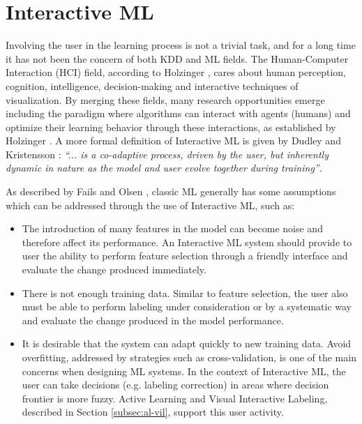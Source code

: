 \section{Interactive ML} %
\label{section2.1}

Involving the user in the learning process is not a trivial task, and for a long time it has not been the concern of both KDD and ML fields. The Human-Computer Interaction (HCI) field, according to Holzinger \cite{Holzinger2013}, cares about human perception, cognition, intelligence, decision-making and interactive techniques of visualization. By merging these fields, many research opportunities emerge including the paradigm where algorithms can interact with agents (humans) and optimize their learning behavior through these interactions, as established by Holzinger \cite{Holzinger2016}. A more formal definition of Interactive ML is given by Dudley and Kristensson \cite{Dudley2018ALearning}: \textit{``... is a co-adaptive process, driven by the user, but inherently dynamic in nature as the model and user evolve together during training''}. 

As described by Fails and Olsen \cite{Fails2003}, classic ML generally has some assumptions which can be addressed through the use of Interactive ML, such as:

\begin{itemize}
\item The introduction of many features in the model can become noise and therefore affect its performance. An Interactive ML system should provide to user the ability to perform feature selection through a friendly interface and evaluate the change produced immediately.
\item There is not enough training data. Similar to feature selection, the user also must be able to perform labeling under consideration or by a systematic way and evaluate the change produced in the model performance. 
\item It is desirable that the system can adapt quickly to new training data. Avoid overfitting, addressed by strategies such as cross-validation, is one of the main concerns when designing ML systems. In the context of Interactive ML, the user can take decisions (e.g. labeling correction) in areas where decision frontier is more fuzzy. Active Learning and Visual Interactive Labeling, described in Section \ref{subsec:al-vil}, support this user activity. 
\end{itemize}

